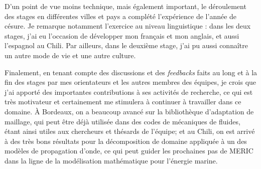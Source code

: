 \indent D'un point de vue moins technique, mais également important, le déroulement des stages en différentes villes et pays a complété l'expérience de l'année de césure. Je remarque notamment l'exercice au niveau linguistique : dans les deux stages, j'ai eu l'occasion de développer mon français et mon anglais, et aussi l'espagnol au Chili. Par ailleurs, dans le deuxième stage, j'ai pu aussi connaître un autre mode de vie et une autre culture.

\indent Finalement, en tenant compte des discussions et des \emph{feedbacks} faits au long et à la fin des stages par mes orientateurs et les autres membres des équipes, je crois que j'ai apporté des importantes contributions à ses activités de recherche, ce qui est très motivateur et certainement me stimulera à continuer à travailler dans ce domaine. À Bordeaux, on a beaucoup avancé sur la bibliothèque d'adaptation de maillage, qui peut être déjà utilisée dans des codes de mécaniques de fluides, étant ainsi utiles aux chercheurs et thésards de l'équipe; et au Chili, on est arrivé à des très bons résultats pour la décomposition de domaine appliquée à un des modèles de propagation  d'onde, ce qui peut guider les prochaines pas de MERIC dans la ligne de la modélisation mathématique pour l'énergie marine.